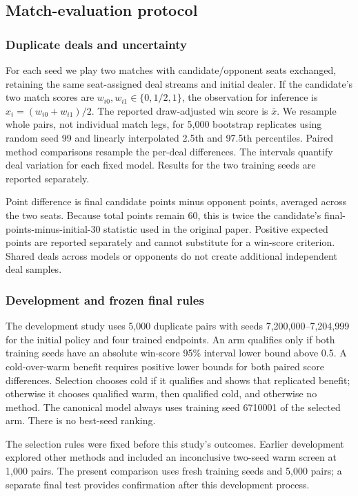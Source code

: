 \subsection{Match-evaluation protocol}
\subsubsection{Duplicate deals and uncertainty}
For each seed we play two matches with candidate/opponent seats exchanged,
retaining the same seat-assigned deal streams and initial dealer. If the
candidate's two match scores are $w_{i0},w_{i1}\in\{0,1/2,1\}$, the observation
for inference is $x_i=(w_{i0}+w_{i1})/2$. The reported draw-adjusted win score
is $\bar x$. We resample whole pairs, not individual match legs, for 5,000
bootstrap replicates using random seed 99 and linearly interpolated 2.5th and
97.5th percentiles. Paired method comparisons resample the per-deal differences.
The intervals quantify deal variation for each fixed model. Results for the
two training seeds are reported separately.

Point difference is final candidate points minus opponent points, averaged
across the two seats. Because total points remain 60, this is twice the
candidate's final-points-minus-initial-30 statistic used in the original paper.
Positive expected points are reported separately and cannot substitute for a
win-score criterion. Shared deals across models or opponents do not create
additional independent deal samples.

\subsubsection{Development and frozen final rules}
The development study uses 5,000 duplicate pairs with seeds
7,200,000--7,204,999 for the initial policy and four trained endpoints. An arm
qualifies only if both training seeds have an absolute win-score 95\% interval
lower bound above 0.5. A cold-over-warm benefit requires positive lower bounds
for both paired score differences. Selection chooses cold if it qualifies and
shows that replicated benefit; otherwise it chooses qualified warm, then
qualified cold, and otherwise no method. The canonical model always uses
training seed 6710001 of the selected arm. There is no best-seed ranking.

The selection rules were fixed before this study's outcomes. Earlier development
explored other methods and included an inconclusive two-seed warm screen at
1,000 pairs. The present comparison uses fresh training seeds and 5,000 pairs;
a separate final test provides confirmation after this development process.

